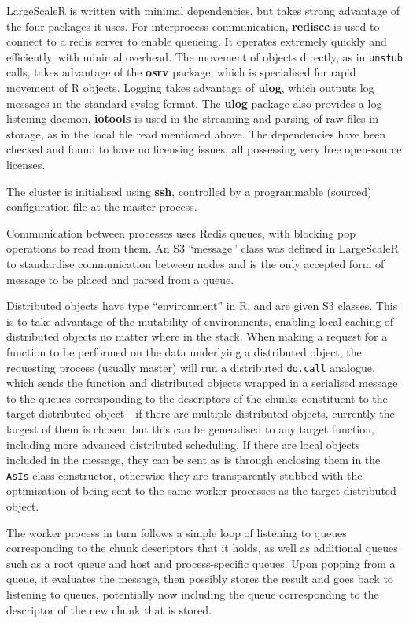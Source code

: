 \documentclass[a4paper,10pt]{article}
\begin{document}
LargeScaleR is written with minimal dependencies, but takes strong advantage of the four packages it uses.
For interprocess communication, \textbf{rediscc} is used to connect to a redis server to enable queueing.
It operates extremely quickly and efficiently, with minimal overhead.
The movement of objects directly, as in \texttt{unstub} calls, takes advantage of the \textbf{osrv} package, which is specialised for rapid movement of R objects.
Logging takes advantage of \textbf{ulog}, which outputs log messages in the standard syslog format.
The \textbf{ulog} package also provides a log listening daemon.
\textbf{iotools} is used in the streaming and parsing of raw files in storage, as in the local file read mentioned above.
The dependencies have been checked and found to have no licensing issues, all possessing very free open-source licenses.

The cluster is initialised using \textbf{ssh}, controlled by a programmable (sourced) configuration file at the master process.

Communication between processes uses Redis queues, with blocking pop operations to read from them.
An S3 ``message'' class was defined in LargeScaleR to standardise communication between nodes and is the only accepted form of message to be placed and parsed from a queue.

Distributed objects have type ``environment'' in R, and are given S3 classes.
This is to take advantage of the mutability of environments, enabling local caching of distributed objects no matter where in the stack.
When making a request for a function to be performed on the data underlying a distributed object, the requesting process (usually master) will run a distributed \texttt{do.call} analogue, which sends the function and distributed objects wrapped in a serialised message to the queues corresponding to the descriptors of the chunks constituent to the target distributed object - if there are multiple distributed objects, currently the largest of them is chosen, but this can be generalised to any target function, including more advanced distributed scheduling.
If there are local objects included in the message, they can be sent as is through enclosing them in the \texttt{AsIs} class constructor, otherwise they are transparently stubbed with the optimisation of being sent to the same worker processes as the target distributed object.

The worker process in turn follows a simple loop of listening to queues corresponding to the chunk descriptors that it holds, as well as additional queues such as a root queue and host and process-specific queues. 
Upon popping from a queue, it evaluates the message, then possibly stores the result and goes back to listening to queues, potentially now including the queue corresponding to the descriptor of the new chunk that is stored.
\end{document}
